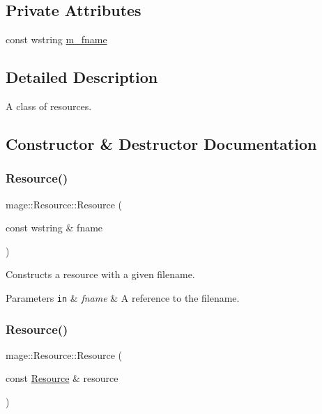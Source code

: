 \subsection*{Private Attributes}
\begin{DoxyCompactItemize}
\item 
const wstring \hyperlink{classmage_1_1_resource_a79267ab1f2ece139405dbe8b4b4d69fa}{m\+\_\+fname}
\end{DoxyCompactItemize}


\subsection{Detailed Description}
A class of resources. 

\subsection{Constructor \& Destructor Documentation}
\hypertarget{classmage_1_1_resource_a3a1972d0ea30505d3a27e566aeb74834}{}\label{classmage_1_1_resource_a3a1972d0ea30505d3a27e566aeb74834} 
\subsubsection{\texorpdfstring{Resource()}{Resource()}\hspace{0.1cm}{\footnotesize\ttfamily [1/2]}}
{\footnotesize\ttfamily mage\+::\+Resource\+::\+Resource (\begin{DoxyParamCaption}\item[{const wstring \&}]{fname }\end{DoxyParamCaption})}

Constructs a resource with a given filename.


\begin{DoxyParams}[1]{Parameters}
\mbox{\tt in}  & {\em fname} & A reference to the filename. \\
\hline
\end{DoxyParams}
\hypertarget{classmage_1_1_resource_ab847b406a175fb1fb43713f58854bf81}{}\label{classmage_1_1_resource_ab847b406a175fb1fb43713f58854bf81} 
\subsubsection{\texorpdfstring{Resource()}{Resource()}\hspace{0.1cm}{\footnotesize\ttfamily [2/2]}}
{\footnotesize\ttfamily mage\+::\+Resource\+::\+Resource (\begin{DoxyParamCaption}\item[{const \hyperlink{classmage_1_1_resource}{Resource} \&}]{resource }\end{DoxyParamCaption})\hspace{0.3cm}{\ttfamily [default]}}

